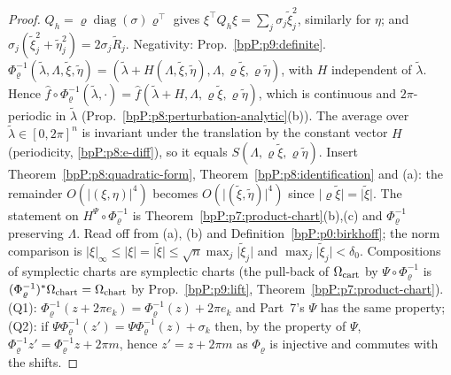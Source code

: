 \begin{proof}
\label{stepP:p9:d-a} $Q_h=\varrho\operatorname{diag}(\sigma)\varrho^\top$ gives $\xi^\top Q_h\xi=\sum_j\sigma_j\tilde\xi_j^2$, similarly for $\eta$; and $\sigma_j(\tilde\xi_j^2+\tilde\eta_j^2)=2\sigma_j\tilde R_j$. Negativity: Prop.~\ref{bpP:p9:definite}.
\label{stepP:p9:d-b} $\Phi_\varrho^{-1}(\tilde\lambda,\Lambda,\tilde\xi,\tilde\eta)=(\tilde\lambda+H(\Lambda,\tilde\xi,\tilde\eta),\Lambda,\varrho\tilde\xi,\varrho\tilde\eta)$, with $H$ independent of $\tilde\lambda$. Hence $\hat f\circ\Phi_\varrho^{-1}(\tilde\lambda,\cdot)=\hat f(\tilde\lambda+H,\Lambda,\varrho\tilde\xi,\varrho\tilde\eta)$, which is continuous and $2\pi$-periodic in $\tilde\lambda$ (Prop.~\ref{bpP:p8:perturbation-analytic}(b)). The average over $\tilde\lambda\in[0,2\pi]^n$ is invariant under the translation by the constant vector $H$ (periodicity, \ref{bpP:p8:e-diff}), so it equals $S(\Lambda,\varrho\tilde\xi,\varrho\tilde\eta)$. Insert Theorem~\ref{bpP:p8:quadratic-form}, Theorem~\ref{bpP:p8:identification} and (a): the remainder $O(\lvert(\xi,\eta)\rvert^4)$ becomes $O(\lvert(\tilde\xi,\tilde\eta)\rvert^4)$ since $\lvert\varrho\tilde\xi\rvert=\lvert\tilde\xi\rvert$. The statement on $H^\Psi\circ\Phi_\varrho^{-1}$ is Theorem~\ref{bpP:p7:product-chart}(b),(c) and $\Phi_\varrho^{-1}$ preserving $\Lambda$.
\label{stepP:p9:d-c} Read off from (a), (b) and Definition~\ref{bpP:p0:birkhoff}; the norm comparison is $\lvert\xi\rvert_\infty\le\lvert\xi\rvert=\lvert\tilde\xi\rvert\le\sqrt n\max_j\lvert\tilde\xi_j\rvert$ and $\max_j\lvert\tilde\xi_j\rvert<\delta_0$.
\label{stepP:p9:d-d} Compositions of symplectic charts are symplectic charts (the pull-back of $\Omega_{\rm cart}$ by $\Psi\circ\Phi_\varrho^{-1}$ is $(\Phi_\varrho^{-1})^*\Omega_{\rm chart}=\Omega_{\rm chart}$ by Prop.~\ref{bpP:p9:lift}, Theorem~\ref{bpP:p7:product-chart}). (Q1): $\Phi_\varrho^{-1}(z+2\pi e_k)=\Phi_\varrho^{-1}(z)+2\pi e_k$ and Part~7's $\Psi$ has the same property; (Q2): if $\Psi\Phi_\varrho^{-1}(z')=\Psi\Phi_\varrho^{-1}(z)+\sigma_k$ then, by the property of $\Psi$, $\Phi_\varrho^{-1}z'=\Phi_\varrho^{-1}z+2\pi m$, hence $z'=z+2\pi m$ as $\Phi_\varrho$ is injective and commutes with the shifts.
\end{proof}

